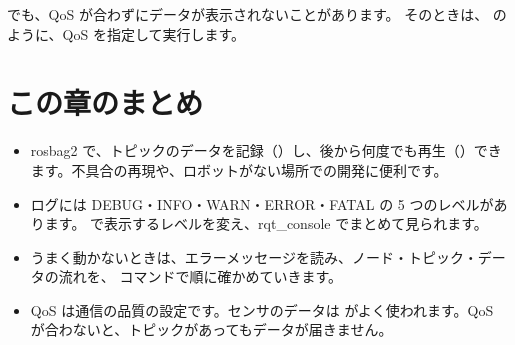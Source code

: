  でも、QoS が合わずにデータが表示されないことがあります。
そのときは、 のように、QoS を指定して実行します。


\section*{この章のまとめ}

\begin{itemize}
  \item rosbag2 で、トピックのデータを記録（）し、後から何度でも再生（）できます。不具合の再現や、ロボットがない場所での開発に便利です。
  \item ログには DEBUG・INFO・WARN・ERROR・FATAL の 5 つのレベルがあります。 で表示するレベルを変え、rqt\_console でまとめて見られます。
  \item うまく動かないときは、エラーメッセージを読み、ノード・トピック・データの流れを、 コマンドで順に確かめていきます。
  \item QoS は通信の品質の設定です。センサのデータは  がよく使われます。QoS が合わないと、トピックがあってもデータが届きません。
\end{itemize}
